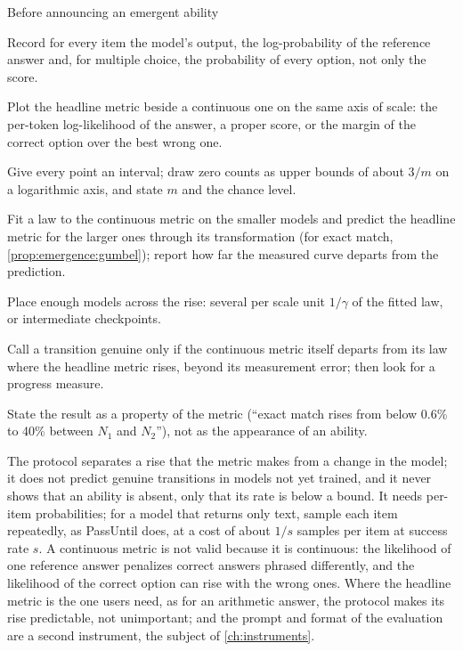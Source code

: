 \begin{refsection}
\begin{protocol}{Before announcing an emergent ability}\label{prot:emergence:announce}
\item Record for every item the model's output, the log-probability of the reference answer and, for multiple choice, the probability of every option, not only the score.
\item Plot the headline metric beside a continuous one on the same axis of scale: the per-token log-likelihood of the answer, a proper score, or the margin of the correct option over the best wrong one.
\item Give every point an interval; draw zero counts as upper bounds of about $3/m$ on a logarithmic axis, and state $m$ and the chance level.
\item Fit a law to the continuous metric on the smaller models and predict the headline metric for the larger ones through its transformation (for exact match, \cref{prop:emergence:gumbel}); report how far the measured curve departs from the prediction.
\item Place enough models across the rise: several per scale unit $1/\gamma$ of the fitted law, or intermediate checkpoints.
\item Call a transition genuine only if the continuous metric itself departs from its law where the headline metric rises, beyond its measurement error; then look for a progress measure.
\item State the result as a property of the metric (``exact match rises from below 0.6\% to 40\% between $N_1$ and $N_2$''), not as the appearance of an ability.
\end{protocol}

The protocol separates a rise that the metric makes from a change in the model; it does not predict genuine transitions in models not yet trained, and it never shows that an ability is absent, only that its rate is below a bound. It needs per-item probabilities; for a model that returns only text, sample each item repeatedly, as PassUntil does, at a cost of about $1/s$ samples per item at success rate $s$. A continuous metric is not valid because it is continuous: the likelihood of one reference answer penalizes correct answers phrased differently, and the likelihood of the correct option can rise with the wrong ones. Where the headline metric is the one users need, as for an arithmetic answer, the protocol makes its rise predictable, not unimportant; and the prompt and format of the evaluation are a second instrument, the subject of \cref{ch:instruments}.


\end{refsection}
